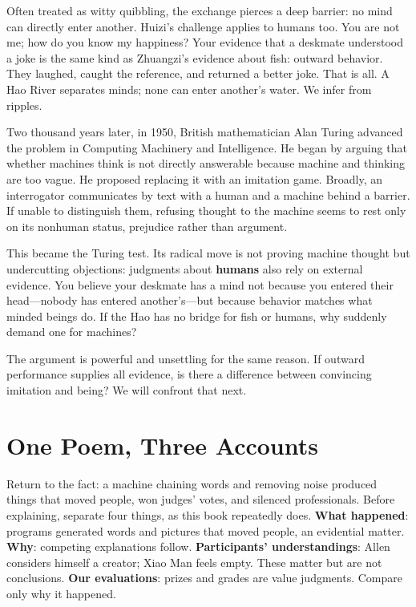 Often treated as witty quibbling, the exchange pierces a deep barrier: no mind can directly enter another. Huizi's challenge applies to humans too. You are not me; how do you know my happiness? Your evidence that a deskmate understood a joke is the same kind as Zhuangzi's evidence about fish: outward behavior. They laughed, caught the reference, and returned a better joke. That is all. A Hao River separates minds; none can enter another's water. We infer from ripples.

Two thousand years later, in 1950, British mathematician Alan Turing advanced the problem in Computing Machinery and Intelligence. He began by arguing that whether machines think is not directly answerable because machine and thinking are too vague. He proposed replacing it with an imitation game. Broadly, an interrogator communicates by text with a human and a machine behind a barrier. If unable to distinguish them, refusing thought to the machine seems to rest only on its nonhuman status, prejudice rather than argument.

This became the Turing test. Its radical move is not proving machine thought but undercutting objections: judgments about \textbf{humans} also rely on external evidence. You believe your deskmate has a mind not because you entered their head---nobody has entered another's---but because behavior matches what minded beings do. If the Hao has no bridge for fish or humans, why suddenly demand one for machines?

The argument is powerful and unsettling for the same reason. If outward performance supplies all evidence, is there a difference between convincing imitation and being? We will confront that next.

\section{One Poem, Three Accounts}
Return to the fact: a machine chaining words and removing noise produced things that moved people, won judges' votes, and silenced professionals. Before explaining, separate four things, as this book repeatedly does. \textbf{What happened}: programs generated words and pictures that moved people, an evidential matter. \textbf{Why}: competing explanations follow. \textbf{Participants' understandings}: Allen considers himself a creator; Xiao Man feels empty. These matter but are not conclusions. \textbf{Our evaluations}: prizes and grades are value judgments. Compare only why it happened.

